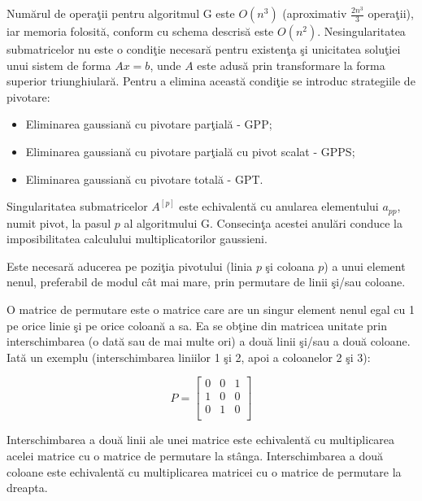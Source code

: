 \documentclass{exam}
\begin{document}
\par Num\u{a}rul de opera\c{t}ii pentru algoritmul G este $O(n^3)$ (aproximativ $\frac{2n^3}{3}$ opera\c{t}ii), iar memoria folosit\u{a}, conform cu schema descris\u{a} este $O(n^2)$. Nesingularitatea submatricelor nu este o condi\c{t}ie necesar\u{a} pentru existen\c{t}a \c{s}i unicitatea solu\c{t}iei unui sistem de forma $Ax=b$, unde $A$ este adus\u{a} prin transformare la forma superior triunghiular\u{a}. Pentru a elimina aceast\u{a} condi\c{t}ie se introduc strategiile de pivotare:

\begin{itemize}
	\item Eliminarea gaussian\u{a} cu pivotare par\c{t}ial\u{a} - GPP;
	\item Eliminarea gaussian\u{a} cu pivotare par\c{t}ial\u{a} cu pivot scalat - GPPS;
	\item Eliminarea gaussian\u{a} cu pivotare total\u{a} - GPT.
\end{itemize}

\par Singularitatea submatricelor $A^{[p]}$ este echivalent\u{a} cu anularea elementului $a_{pp}$, numit pivot, la pasul $p$ al algoritmului G. Consecin\c{t}a acestei anul\u{a}ri conduce la imposibilitatea calculului multiplicatorilor gaussieni.

\par Este necesar\u{a} aducerea pe pozi\c{t}ia pivotului (linia $p$ \c{s}i coloana $p$) a unui element nenul, preferabil de modul c\^at mai mare, prin permutare de linii \c{s}i/sau coloane.

\par O matrice de permutare este o matrice care are un singur element nenul egal cu 1 pe orice linie \c{s}i pe orice coloan\u{a} a sa. Ea se ob\c{t}ine din matricea unitate prin interschimbarea (o dat\u{a} sau de mai multe ori) a dou\u{a} linii \c{s}i/sau a dou\u{a} coloane. Iat\u{a} un exemplu (interschimbarea liniilor 1 \c{s}i 2, apoi a coloanelor 2 \c{s}i 3):

\[
	P = \begin{bmatrix}
		0 & 0 & 1 \\
		1 & 0 & 0 \\
		0 & 1 & 0 \\
	\end{bmatrix}
\]

Interschimbarea a dou\u{a} linii ale unei matrice este echivalent\u{a} cu multiplicarea acelei matrice cu o matrice de permutare la st\^{a}nga. Interschimbarea a dou\u{a} coloane este echivalent\u{a} cu multiplicarea matricei cu o matrice de permutare la dreapta.
\end{document}
